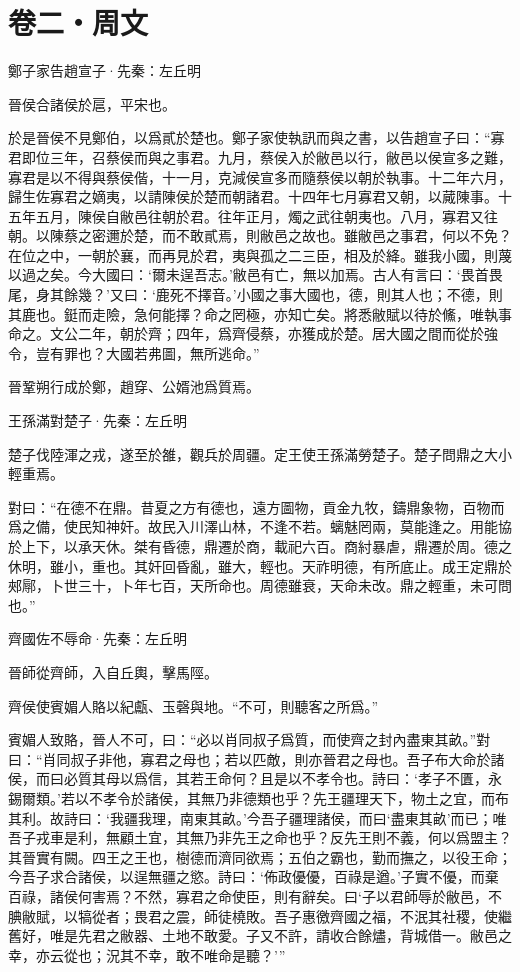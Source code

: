 \documentclass[12pt,a4paper]{ctexbook}
\begin{document}
\section{卷二・周文}
鄭子家告趙宣子·先秦：左丘明 \par
晉侯合諸侯於扈，平宋也。\par
於是晉侯不見鄭伯，以爲貳於楚也。鄭子家使執訊而與之書，以告趙宣子曰：“寡君即位三年，召蔡侯而與之事君。九月，蔡侯入於敝邑以行，敝邑以侯宣多之難，寡君是以不得與蔡侯偕，十一月，克減侯宣多而隨蔡侯以朝於執事。十二年六月，歸生佐寡君之嫡夷，以請陳侯於楚而朝諸君。十四年七月寡君又朝，以蕆陳事。十五年五月，陳侯自敝邑往朝於君。往年正月，燭之武往朝夷也。八月，寡君又往朝。以陳蔡之密邇於楚，而不敢貳焉，則敝邑之故也。雖敝邑之事君，何以不免？在位之中，一朝於襄，而再見於君，夷與孤之二三臣，相及於絳。雖我小國，則蔑以過之矣。今大國曰：‘爾未逞吾志。’敝邑有亡，無以加焉。古人有言曰：‘畏首畏尾，身其餘幾？’又曰：‘鹿死不擇音。’小國之事大國也，德，則其人也；不德，則其鹿也。鋌而走險，急何能擇？命之罔極，亦知亡矣。將悉敝賦以待於鯈，唯執事命之。文公二年，朝於齊；四年，爲齊侵蔡，亦獲成於楚。居大國之間而從於強令，豈有罪也？大國若弗圖，無所逃命。”\par
晉鞏朔行成於鄭，趙穿、公婿池爲質焉。\par
王孫滿對楚子·先秦：左丘明 \par
楚子伐陸渾之戎，遂至於雒，觀兵於周疆。定王使王孫滿勞楚子。楚子問鼎之大小輕重焉。\par
對曰：“在德不在鼎。昔夏之方有德也，遠方圖物，貢金九牧，鑄鼎象物，百物而爲之備，使民知神奸。故民入川澤山林，不逢不若。螭魅罔兩，莫能逢之。用能協於上下，以承天休。桀有昏德，鼎遷於商，載祀六百。商紂暴虐，鼎遷於周。德之休明，雖小，重也。其奸回昏亂，雖大，輕也。天祚明德，有所底止。成王定鼎於郟鄏，卜世三十，卜年七百，天所命也。周德雖衰，天命未改。鼎之輕重，未可問也。”\par
齊國佐不辱命·先秦：左丘明 \par
晉師從齊師，入自丘輿，擊馬陘。\par
齊侯使賓媚人賂以紀甗、玉磬與地。“不可，則聽客之所爲。”\par
賓媚人致賂，晉人不可，曰：“必以肖同叔子爲質，而使齊之封內盡東其畝。”對曰：“肖同叔子非他，寡君之母也；若以匹敵，則亦晉君之母也。吾子布大命於諸侯，而曰必質其母以爲信，其若王命何？且是以不孝令也。詩曰：‘孝子不匱，永錫爾類。’若以不孝令於諸侯，其無乃非德類也乎？先王疆理天下，物土之宜，而布其利。故詩曰：‘我疆我理，南東其畝。’今吾子疆理諸侯，而曰‘盡東其畝’而已；唯吾子戎車是利，無顧土宜，其無乃非先王之命也乎？反先王則不義，何以爲盟主？其晉實有闕。四王之王也，樹德而濟同欲焉；五伯之霸也，勤而撫之，以役王命；今吾子求合諸侯，以逞無疆之慾。詩曰：‘佈政優優，百祿是遒。’子實不優，而棄百祿，諸侯何害焉？不然，寡君之命使臣，則有辭矣。曰‘子以君師辱於敝邑，不腆敝賦，以犒從者；畏君之震，師徒橈敗。吾子惠徼齊國之福，不泯其社稷，使繼舊好，唯是先君之敝器、土地不敢愛。子又不許，請收合餘燼，背城借一。敝邑之幸，亦云從也；況其不幸，敢不唯命是聽？’”\par
\end{document}

